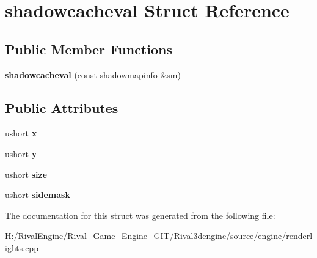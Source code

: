\hypertarget{structshadowcacheval}{}\section{shadowcacheval Struct Reference}
\label{structshadowcacheval}
\subsection*{Public Member Functions}
\begin{DoxyCompactItemize}
\item 
\mbox{\label{structshadowcacheval_a7d0e1e113abae9f9478a59267bd147a1}} 
{\bfseries shadowcacheval} (const \hyperlink{structshadowmapinfo}{shadowmapinfo} \&sm)
\end{DoxyCompactItemize}
\subsection*{Public Attributes}
\begin{DoxyCompactItemize}
\item 
\mbox{\label{structshadowcacheval_a9d141593f2614239a00676d256fc3c90}} 
ushort {\bfseries x}
\item 
\mbox{\label{structshadowcacheval_a21d8c57323c542443e8792d23e11aaad}} 
ushort {\bfseries y}
\item 
\mbox{\label{structshadowcacheval_a77b3f4023323bae3602567e54ae6bf62}} 
ushort {\bfseries size}
\item 
\mbox{\label{structshadowcacheval_a1a4b42ba0124164d4fda5a7e1318f66e}} 
ushort {\bfseries sidemask}
\end{DoxyCompactItemize}


The documentation for this struct was generated from the following file\+:\begin{DoxyCompactItemize}
\item 
H\+:/\+Rival\+Engine/\+Rival\+\_\+\+Game\+\_\+\+Engine\+\_\+\+G\+I\+T/\+Rival3dengine/source/engine/renderlights.\+cpp\end{DoxyCompactItemize}
